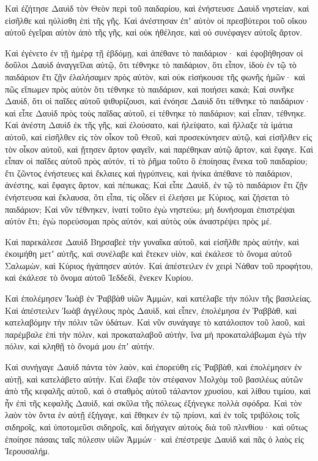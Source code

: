 {Καὶ ἐζήτησε Δαυὶδ τὸν Θεὸν περὶ τοῦ παιδαρίου, καὶ ἐνήστευσε Δαυὶδ νηστείαν, καὶ εἰσῆλθε καὶ ηὐλίσθη ἐπὶ τῆς γῆς.
Καὶ ἀνέστησαν ἐπʼ αὐτὸν οἱ πρεσβύτεροι τοῦ οἴκου αὐτοῦ ἐγεῖραι αὐτὸν ἀπὸ τῆς γῆς, καὶ οὐκ ἠθέλησε, καὶ οὐ συνέφαγεν αὐτοῖς ἄρτον.
\par }{\PP {}Καὶ ἐγένετο ἐν τῇ ἡμέρᾳ τῇ ἑβδόμῃ, καὶ ἀπέθανε τὸ παιδάριον· καὶ ἐφοβήθησαν οἱ δοῦλοι Δαυὶδ ἀναγγεῖλαι αὐτῷ, ὅτι τέθνηκε τὸ παιδάριον, ὅτι εἶπον, ἰδοὺ ἐν τῷ τὸ παιδάριον ἔτι ζῇν ἐλαλήσαμεν πρὸς αὐτὸν, καὶ οὐκ εἰσήκουσε τῆς φωνῆς ἡμῶν· καὶ πῶς εἴπωμεν πρὸς αὐτὸν ὅτι τέθνηκε τὸ παιδάριον, καὶ ποιήσει κακά;
Καὶ συνῆκε Δαυὶδ, ὅτι οἱ παῖδες αὐτοῦ ψιθυρίζουσι, καὶ ἐνόησε Δαυὶδ ὅτι τέθνηκε τὸ παιδάριον· καὶ εἶπε Δαυὶδ πρὸς τοὺς παῖδας αὐτοῦ, εἰ τέθνηκε τὸ παιδάριον; καὶ εἶπαν, τέθνηκε.
Καὶ ἀνέστη Δαυὶδ ἐκ τῆς γῆς, καὶ ἐλούσατο, καὶ ἠλείψατο, καὶ ἤλλαξε τὰ ἱμάτια αὐτοῦ, καὶ εἰσῆλθεν εἰς τὸν οἶκον τοῦ Θεοῦ, καὶ προσεκύνησεν αὐτῷ, καὶ εἰσῆλθεν εἰς τὸν οἶκον αὐτοῦ, καὶ ᾔτησεν ἄρτον φαγεῖν, καὶ παρέθηκαν αὐτῷ ἄρτον, καὶ ἔφαγε.
Καὶ εἶπαν οἱ παῖδες αὐτοῦ πρὸς αὐτόν, τί τὸ ῥῆμα τοῦτο ὃ ἐποίησας ἕνεκα τοῦ παιδαρίου; ἔτι ζῶντος ἐνήστευες καὶ ἔκλαιες καὶ ἠγρύπνεις, καὶ ἡνίκα ἀπέθανε τὸ παιδάριον, ἀνέστης, καὶ ἔφαγες ἄρτον, καὶ πέπωκας;
Καὶ εἶπε Δαυὶδ, ἐν τῷ τὸ παιδάριον ἔτι ζῇν ἐνήστευσα καὶ ἔκλαυσα, ὅτι εἶπα, τίς οἶδεν εἰ ἐλεήσει με Κύριος, καὶ ζήσεται τὸ παιδάριον;
Καὶ νῦν τέθνηκεν, ἱνατί τοῦτο ἐγὼ νηστεύω; μὴ δυνήσομαι ἐπιστρέψαι αὐτὸν ἔτι; ἐγὼ πορεύσομαι πρὸς αὐτόν, καὶ αὐτὸς οὐκ ἀναστρέψει πρὸς μέ.
\par }{\PP {}Καὶ παρεκάλεσε Δαυὶδ Βηρσαβεὲ τὴν γυναῖκα αὐτοῦ, καὶ εἰσῆλθε πρὸς αὐτὴν, καὶ ἐκοιμήθη μετʼ αὐτῆς, καὶ συνέλαβε καὶ ἔτεκεν υἱὸν, καὶ ἐκάλεσε τὸ ὄνομα αὐτοῦ Σαλωμὼν, καὶ Κύριος ἠγάπησεν αὐτόν.
Καὶ ἀπέστειλεν ἐν χειρὶ Νάθαν τοῦ προφήτου, καὶ ἐκάλεσε τὸ ὄνομα αὐτοῦ Ἰεδδεδὶ, ἕνεκεν Κυρίου.
\par }{\PP {}Καὶ ἐπολέμησεν Ἰωὰβ ἐν Ῥαββὰθ υἱῶν Ἀμμὼν, καὶ κατέλαβε τὴν πόλιν τῆς βασιλείας.
Καὶ ἀπέστειλεν Ἰωὰβ ἀγγέλους πρὸς Δαυὶδ, καὶ εἶπεν, ἐπολέμησα ἐν Ῥαββὰθ, καὶ κατελαβόμην τὴν πόλιν τῶν ὑδάτων.
Καὶ νῦν συνάγαγε τὸ κατάλοιπον τοῦ λαοῦ, καὶ παρέμβαλε ἐπὶ τὴν πόλιν, καὶ προκαταλαβοῦ αὐτὴν, ἵνα μὴ προκαταλάβωμαι ἐγὼ τὴν πόλιν, καὶ κληθῇ τὸ ὄνομά μου ἐπʼ αὐτήν.
\par }{\PP {}Καὶ συνήγαγε Δαυὶδ πάντα τὸν λαὸν, καὶ ἐπορεύθη εἰς Ῥαββὰθ, καὶ ἐπολέμησεν ἐν αὐτῇ, καὶ κατελάβετο αὐτήν.
Καὶ ἔλαβε τὸν στέφανον Μολχὸμ τοῦ βασιλέως αὐτῶν ἀπὸ τῆς κεφαλῆς αὐτοῦ, καὶ ὁ σταθμὸς αὐτοῦ τάλαντον χρυσίου, καὶ λίθου τιμίου, καὶ ἦν ἐπὶ τῆς κεφαλῆς Δαυὶδ, καὶ σκῦλα τῆς πόλεως ἐξήνεγκε πολλὰ σφόδρα.
Καὶ τὸν λαὸν τὸν ὄντα ἐν αὐτῇ ἐξήγαγε, καὶ ἔθηκεν ἐν τῷ πρίονι, καὶ ἐν τοῖς τριβόλοις τοῖς σιδηροῖς, καὶ ὑποτομεῦσι σιδηροῖς, καὶ διήγαγεν αὐτοὺς διὰ τοῦ πλινθίου· καὶ οὕτως ἐποίησε πάσαις ταῖς πόλεσιν υἱῶν Ἀμμών· καὶ ἐπέστρεψε Δαυὶδ καὶ πᾶς ὁ λαὸς εἰς Ἰερουσαλήμ.

}
